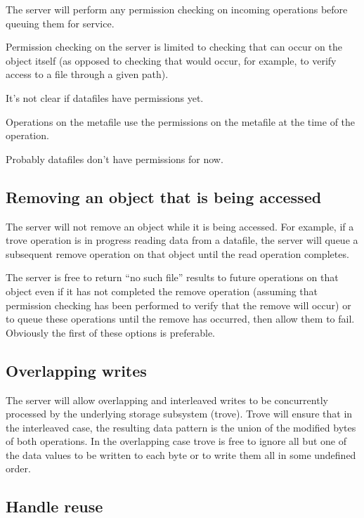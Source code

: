 \documentclass[10pt]{article} %
\begin{document}
The server will perform any permission checking on incoming operations before
queuing them for service.

Permission checking on the server is limited to checking that can occur on the
object itself (as opposed to checking that would occur, for example, to verify
access to a file through a given path).

It's not clear if datafiles have permissions yet.

Operations on the metafile use the permissions on the metafile at the time of
the operation.

Probably datafiles don't have permissions for now.



\subsection{Removing an object that is being accessed}

The server will not remove an object while it is being accessed.  For example,
if a trove operation is in progress reading data from a datafile, the server
will queue a subsequent remove operation on that object until the read
operation completes.

The server is free to return ``no such file'' results to future operations on
that object even if it has not completed the remove operation (assuming that
permission checking has been performed to verify that the remove will occur)
or to queue these operations until the remove has occurred, then allow them to
fail.  Obviously the first of these options is preferable.

\subsection{Overlapping writes}

The server will allow overlapping and interleaved writes to be concurrently
processed by the underlying storage subsystem (trove).  Trove will ensure that
in the interleaved case, the resulting data pattern is the union of the
modified bytes of both operations.  In the overlapping case trove is free to
ignore all but one of the data values to be written to each byte or to write
them all in some undefined order.

\subsection{Handle reuse}
\end{document}
